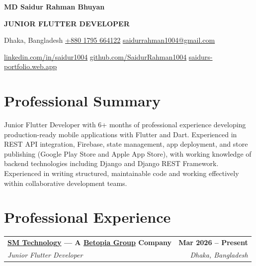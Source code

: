 \documentclass[10.5pt, a4paper]{article}
\makeatletter
\newcommand{\expentry}[4]{%
  \begin{tabularx}{\linewidth}{@{}X r@{}}
    \textbf{\large #1} & \textbf{\small\color{cnavy}#2} \\[1pt]
    \textit{\color{csteel}#3} & \textit{\small\color{csteel}#4}
  \end{tabularx}%
}
\newcommand{\sep}{\hspace{0.7em}{\color{crule}\textbullet}\hspace{0.7em}}
\makeatother
\begin{document}

\begin{center}
  {\Huge\bfseries\color{cnavy} MD Saidur Rahman Bhuyan}

  \vspace{5pt}

  {\Large\bfseries\color{csteel} JUNIOR FLUTTER DEVELOPER}

  \vspace{10pt}

  {\normalsize
    Dhaka, Bangladesh
    \sep
    \href{https://wa.me/8801795664122}{+880 1795 664122}
    \sep
    \href{mailto:saidurrahman1004@gmail.com}{saidurrahman1004@gmail.com}
  }

  \vspace{5pt}

  {\normalsize
    \href{https://www.linkedin.com/in/saidur1004/}{linkedin.com/in/saidur1004}
    \sep
    \href{https://github.com/SaidurRahman1004}{github.com/SaidurRahman1004}
    \sep
    \href{https://saidurs-portfolio.web.app}{saidurs-portfolio.web.app}
  }
\end{center}

\vspace{6pt}

\section{Professional Summary}

{\small
Junior Flutter Developer with 6+ months of professional experience developing
production-ready mobile applications with Flutter and Dart. Experienced in REST
API integration, Firebase, state management, app deployment, and store publishing
(Google Play Store and Apple App Store), with working knowledge of backend
technologies including Django and Django REST Framework. Experienced in writing
structured, maintainable code and working effectively within collaborative
development teams.
}

\section{Professional Experience}

\expentry{\href{https://smtech24.com/}{SM Technology} --- A \href{https://betopiagroup.com/}{Betopia Group} Company}{Mar 2026 -- Present}{Junior Flutter Developer}{Dhaka, Bangladesh}
\end{document}
